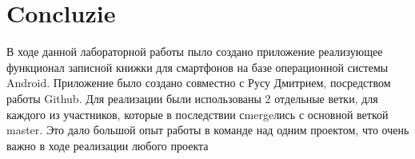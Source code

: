 \section*{Concluzie}
{}
В ходе данной лабораторной работы пыло создано приложение реализующее функционал записной книжки для смартфонов на базе операционной системы Android. Приложение было создано совместно с Русу Дмитрием, посредством работы Github. Для реализации были использованы 2 отдельные ветки, для каждого из участников, которые в последствии сmergeлись с основной веткой master. Это дало большой опыт работы в команде над одним проектом, что очень важно в ходе реализации любого проекта 

\clearpage